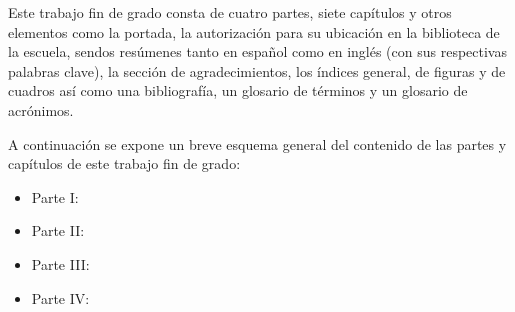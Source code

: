 Este trabajo fin de grado consta de cuatro partes, siete capítulos y otros elementos como la portada, la autorización para su ubicación en la biblioteca de la escuela, sendos resúmenes tanto en español como en inglés (con sus respectivas palabras clave), la sección de agradecimientos, los índices general, de figuras y de cuadros así como una bibliografía, un glosario de términos y un glosario de acrónimos.

A continuación se expone un breve esquema general del contenido de las partes y capítulos de este trabajo fin de grado:

\begin{itemize}
\item Parte I:
\item Parte II:
\item Parte III:
\item Parte IV:
\end{itemize}